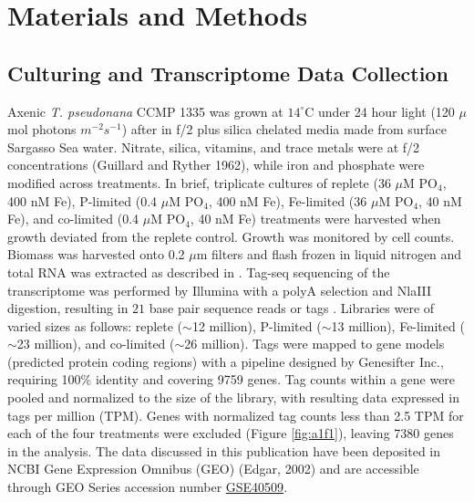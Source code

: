 \section{Materials and Methods}
\subsection{Culturing and Transcriptome Data Collection} 
Axenic \textit{T. pseudonana} CCMP 1335 was grown at $14^{\circ}$C under 24 hour light (120 $\mu$mol photons $m^{-2} s^{-1}$) after \citet{Dyhrman2012} in f/2 plus silica chelated media made from surface Sargasso Sea water. Nitrate, silica, vitamins, and trace metals were at f/2 concentrations (Guillard and Ryther 1962), while iron and phosphate were modified across treatments. In brief, triplicate cultures of replete (36 $\mu$M PO$_{4}$, 400 nM Fe), P-limited (0.4 $\mu$M PO$_{4}$, 400 nM Fe), Fe-limited (36 $\mu$M PO$_{4}$, 40 nM Fe), and co-limited (0.4 $\mu$M PO$_{4}$, 40 nM Fe) treatments were harvested when growth deviated from the replete control. Growth was monitored by cell counts. Biomass was harvested onto 0.2 $\mu$m filters and flash frozen in liquid nitrogen and total RNA was extracted as described in \citep{Dyhrman2012}. Tag-seq sequencing of the transcriptome was performed by Illumina with a polyA selection and NlaIII digestion, resulting in $21$ base pair sequence reads or tags \citep{Dyhrman2012}. Libraries were of varied sizes as follows: replete ($\sim$12 million), P-limited ($\sim$13 million), Fe-limited ($\sim$23 million), and co-limited ($\sim$26 million). Tags were mapped to gene models (predicted protein coding regions) with a pipeline designed by Genesifter Inc., requiring 100\% identity and covering 9759 genes. Tag counts within a gene were pooled and normalized to the size of the library, with resulting data expressed in tags per million (TPM). Genes with normalized tag counts less than 2.5 TPM for each of the four treatments were excluded (Figure \ref{fig:a1f1}), leaving 7380 genes in the analysis. The data discussed in this publication have been deposited in NCBI Gene Expression Omnibus (GEO) (Edgar, 2002) and are accessible through GEO Series accession number \href{http://www.ncbi.nlm.nih.gov/geo/query/acc.cgi?acc=GSE40509}{GSE40509}.  
